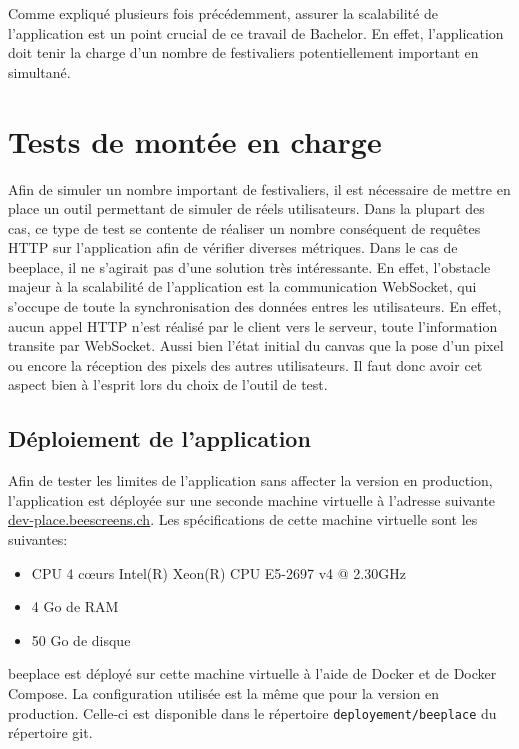 Comme expliqué plusieurs fois précédemment, assurer la scalabilité de l'application est un point crucial de ce travail de Bachelor. En effet, l'application doit tenir la charge d'un nombre de festivaliers potentiellement important en simultané.

\section{Tests de montée en charge}

Afin de simuler un nombre important de festivaliers, il est nécessaire de mettre en place un outil permettant de simuler de réels utilisateurs. Dans la plupart des cas, ce type de test se contente de réaliser un nombre conséquent de requêtes HTTP sur l'application afin de vérifier diverses métriques. Dans le cas de \gls{beeplace}, il ne s'agirait pas d'une solution très intéressante. En effet, l'obstacle majeur à la scalabilité de l'application est la communication WebSocket, qui s'occupe de toute la synchronisation des données entres les utilisateurs. En effet, aucun appel HTTP n'est réalisé par le client vers le serveur, toute l'information transite par WebSocket. Aussi bien l'état initial du canvas que la pose d'un pixel ou encore la réception des pixels des autres utilisateurs. Il faut donc avoir cet aspect bien à l'esprit lors du choix de l'outil de test.

\subsection{Déploiement de l'application}

Afin de tester les limites de l'application sans affecter la version en production, l'application est déployée sur une seconde machine virtuelle à l'adresse suivante \href{https://dev-place.beescreens.ch}{dev-place.beescreens.ch}. Les spécifications de cette machine virtuelle sont les suivantes:

\begin{itemize}
  \item CPU 4 c\oe{}urs Intel(R) Xeon(R) CPU E5-2697 v4 @ 2.30GHz
  \item 4 Go de RAM
  \item 50 Go de disque
\end{itemize}

\gls{beeplace} est déployé sur cette machine virtuelle à l'aide de Docker et de Docker Compose. La configuration utilisée est la même que pour la version en production. Celle-ci est disponible dans le répertoire \texttt{deployement/beeplace} du répertoire git.


